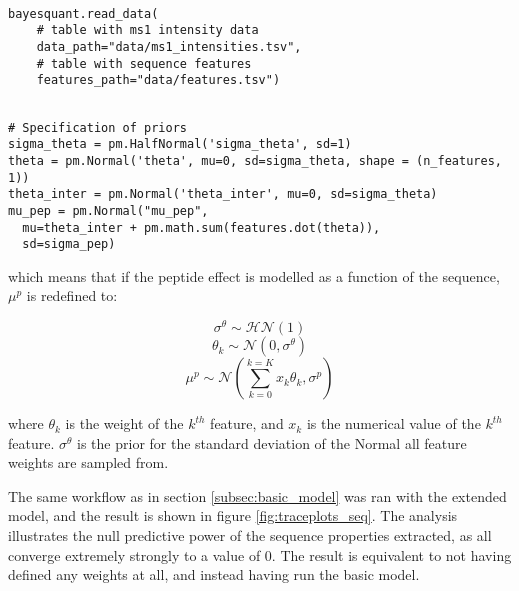\begin{verbatim}

bayesquant.read_data(
    # table with ms1 intensity data
    data_path="data/ms1_intensities.tsv",
    # table with sequence features
    features_path="data/features.tsv")
\end{verbatim}


\begin{verbatim}

# Specification of priors
sigma_theta = pm.HalfNormal('sigma_theta', sd=1)
theta = pm.Normal('theta', mu=0, sd=sigma_theta, shape = (n_features, 1))
theta_inter = pm.Normal('theta_inter', mu=0, sd=sigma_theta)
mu_pep = pm.Normal("mu_pep",
  mu=theta_inter + pm.math.sum(features.dot(theta)),
  sd=sigma_pep)   
\end{verbatim}

which means that if the peptide effect is modelled as a function of the sequence, $\mu^p$ is redefined to:

        
\begin{equation}
\nonumber \sigma^{\theta} \sim \mathcal{HN}(1)
\end{equation}
\begin{equation}
\nonumber \theta_k \sim \mathcal{N}(0, \sigma^{\theta})
\end{equation}
\begin{equation}
\nonumber \mu^p \sim \mathcal{N}(\sum_{k=0}^{k=K}{x_k \theta_k}, \sigma^p)
\end{equation}

where $\theta_k$ is the weight of the $k^{th}$ feature, and $x_k$ is the numerical value of the $k^{th}$ feature. $\sigma^{\theta}$ is the prior for the standard deviation of the Normal all feature weights are sampled from.

The same workflow as in section \ref{subsec:basic_model} was ran with the extended model, and the result is shown in figure \ref{fig:traceplots_seq}. The analysis illustrates the null predictive power of the sequence properties extracted, as all converge extremely strongly to a value of 0. The result is equivalent to not having defined any weights at all, and instead having run the basic model.




